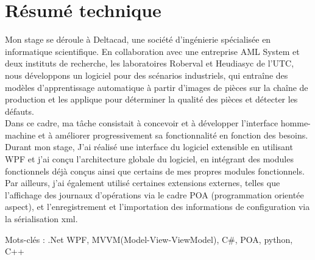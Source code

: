 \chapter*{Résumé technique}

Mon stage se déroule à Deltacad, une société d’ingénierie spécialisée en informatique scientifique. En collaboration avec une entreprise AML System et deux instituts de recherche, les laboratoires Roberval et Heudiasyc de l’UTC, nous développons un logiciel pour des scénarios industriels, qui entraîne des modèles d’apprentissage automatique à partir d’images de pièces sur la chaîne de production et les applique pour déterminer la qualité des pièces et détecter les défauts.\\

Dans ce cadre, ma tâche consistait à concevoir et à développer l'interface homme-machine et à améliorer progressivement sa fonctionnalité en fonction des besoins.
Durant mon stage, J'ai réalisé une interface du logiciel extensible en utilisant WPF et j'ai conçu l'architecture globale du logiciel, en intégrant des modules fonctionnels déjà conçus ainsi que certains de mes propres modules fonctionnels. Par ailleurs, j'ai également utilisé certaines extensions externes, telles que l'affichage des journaux d'opérations via le cadre POA (programmation orientée aspect), et l'enregistrement et l'importation des informations de configuration via la sérialisation xml.\\

\vspace{1\baselineskip}

\noindent Mots-clés : .Net WPF, MVVM(Model-View-ViewModel), C\#, POA, python, C++